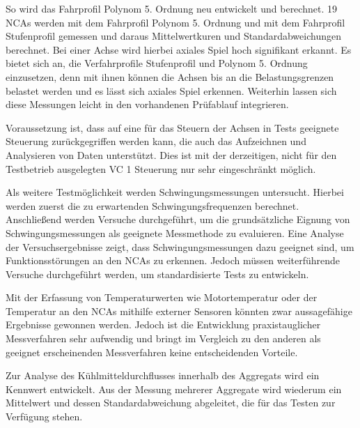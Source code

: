 So wird das Fahrprofil Polynom 5. Ordnung neu entwickelt und berechnet. 19 NCAs werden mit dem Fahrprofil Polynom 5. Ordnung und mit dem Fahrprofil Stufenprofil gemessen und daraus Mittelwertkuren und Standardabweichungen berechnet. Bei einer Achse wird hierbei axiales Spiel hoch signifikant erkannt. Es bietet sich an, die Verfahrprofile Stufenprofil und Polynom 5. Ordnung einzusetzen, denn mit ihnen können die Achsen bis an die Belastungsgrenzen belastet werden und es lässt sich axiales Spiel erkennen. Weiterhin lassen sich diese Messungen leicht in den vorhandenen Prüfablauf integrieren.



Voraussetzung ist, dass auf eine für das Steuern der Achsen in Tests geeignete Steuerung zurückgegriffen werden kann, die auch das Aufzeichnen und Analysieren von Daten unterstützt. Dies ist mit der derzeitigen, nicht für den Testbetrieb ausgelegten VC 1 Steuerung nur sehr eingeschränkt möglich.

Als weitere Testmöglichkeit werden Schwingungsmessungen untersucht. Hierbei werden zuerst die zu erwartenden Schwingungsfrequenzen berechnet. Anschließend werden Versuche durchgeführt, um die grundsätzliche Eignung von Schwingungsmessungen als geeignete Messmethode zu evaluieren. Eine Analyse der Versuchsergebnisse zeigt, dass Schwingungsmessungen dazu geeignet sind, um Funktionsstörungen an den NCAs zu erkennen. Jedoch müssen weiterführende Versuche durchgeführt werden, um standardisierte Tests zu entwickeln.

Mit der Erfassung von Temperaturwerten wie Motortemperatur oder der Temperatur an den NCAs mithilfe externer Sensoren könnten zwar aussagefähige Ergebnisse gewonnen werden. Jedoch ist die Entwicklung praxistauglicher Messverfahren sehr aufwendig und bringt im Vergleich zu den anderen als geeignet erscheinenden Messverfahren keine entscheidenden Vorteile.








Zur Analyse des Kühlmitteldurchflusses innerhalb des Aggregats wird ein Kennwert entwickelt. Aus der  Messung mehrerer Aggregate wird wiederum ein Mittelwert und dessen Standardabweichung abgeleitet,  die für das Testen zur Verfügung stehen.

